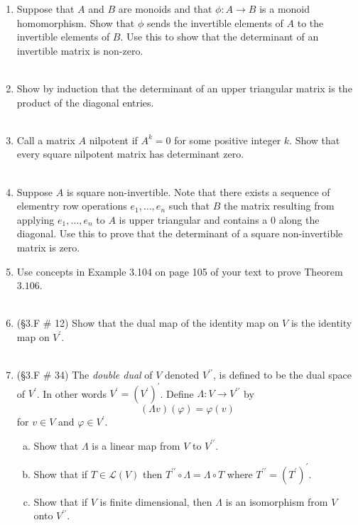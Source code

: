\documentclass[12pt,letterpaper]{article}
\theoremstyle{plain}
\theoremstyle{definition}
\begin{document}
\begin{enumerate}[1.]
\item Suppose that $A$ and $B$ are monoids and that $\phi:A\rightarrow B$ is a monoid homomorphism. Show that $\phi$ sends the invertible elements of $A$ to the invertible elements of $B$. Use this to show that the determinant of an invertible matrix is non-zero. \\
\ \\
\item Show by induction that the determinant of an upper triangular matrix is the product of the diagonal entries. \\
\ \\
\item Call a matrix $A$ nilpotent if $A^k=0$ for some positive integer $k$. Show that every square nilpotent matrix has determinant zero. \\
\ \\
\item Suppose $A$ is square non-invertible. Note that there exists a sequence of elementry row operations $e_1,\ldots ,e_n$ such that 
$B$ the matrix resulting from applying $e_1,\ldots, e_n$ to $A$ is upper triangular and contains a $0$ along the diagonal. Use this to prove that the determinant of a square non-invertible matrix is zero. 
\ \\
\item Use concepts in Example 3.104 on page 105 of your text to prove Theorem $3.106$.\\
\ \\
\item (\S 3.F \# 12) Show that the dual map of the identity map on $V$ is the identity map on $V^\prime$. \\
\ \\
\item (\S 3.F \# 34) The \emph{double dual} of $V$ denoted $V^{\prime\prime}$, is defined to be the dual space of $V^\prime$. In other words $V^{\prime}=(V^\prime)^\prime$. Define $\Lambda:V\rightarrow V^{\prime\prime}$ by 
\[(\Lambda v) (\varphi)=\varphi(v)\]
for $v\in V$ and $\varphi \in V^\prime$. 
\begin{enumerate}[(a)]
\item Show that $\Lambda$ is a linear map from $V$ to $V^{\prime\prime}$. 
\item Show that if $T\in \mathcal{L}(V)$ then $T^{\prime\prime}\circ \Lambda=\Lambda\circ T$ where $T^{\prime\prime}=(T^\prime)^\prime$. 
\item Show that if $V$ is finite dimensional, then $\Lambda$ is an isomorphism from $V$ onto $V^{\prime\prime}$.
\end{enumerate}
\end{enumerate}
\end{document}
